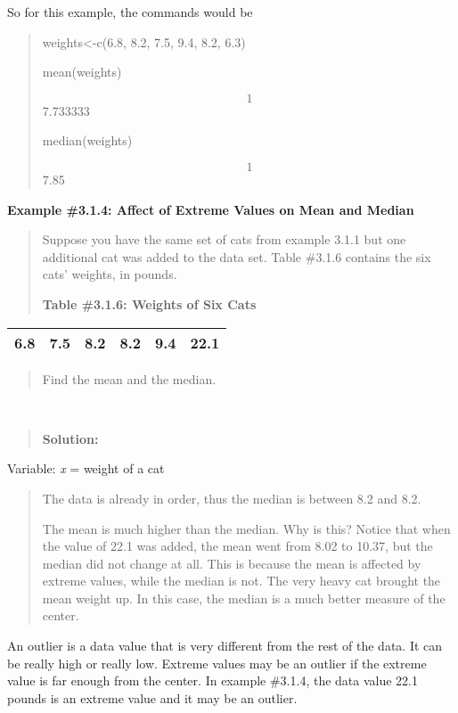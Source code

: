 \documentclass[]{book}
\begin{document}
So for this example, the commands would be

\begin{quote}
weights\textless{}-c(6.8, 8.2, 7.5, 9.4, 8.2, 6.3)

mean(weights)

\[1\] 7.733333

median(weights)

\[1\] 7.85
\end{quote}

\textbf{Example \#3.1.4: Affect of Extreme Values on Mean and Median}

\begin{quote}
Suppose you have the same set of cats from example 3.1.1 but one
additional cat was added to the data set. Table \#3.1.6 contains the
six cats' weights, in pounds.

\textbf{Table \#3.1.6: Weights of Six Cats}
\end{quote}

\begin{longtable}[]{@{}llllll@{}}
\toprule
\endhead
6.8 & 7.5 & 8.2 & 8.2 & 9.4 & 22.1\tabularnewline
\bottomrule
\end{longtable}

\begin{quote}
Find the mean and the median.
\end{quote}

\textbf{\\
}

\begin{quote}
\textbf{Solution:}
\end{quote}

Variable: \emph{x} = weight of a cat

\begin{quote}
The data is already in order, thus the median is between 8.2 and 8.2.

The mean is much higher than the median. Why is this? Notice that when
the value of 22.1 was added, the mean went from 8.02 to 10.37, but the
median did not change at all. This is because the mean is affected by
extreme values, while the median is not. The very heavy cat brought
the mean weight up. In this case, the median is a much better measure
of the center.
\end{quote}

An outlier is a data value that is very different from the rest of the
data. It can be really high or really low. Extreme values may be an
outlier if the extreme value is far enough from the center. In example
\#3.1.4, the data value 22.1 pounds is an extreme value and it may be an
outlier.
\end{document}
